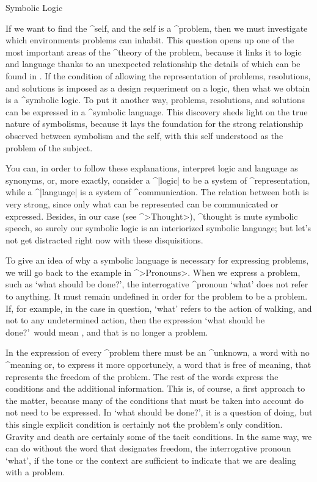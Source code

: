 \Section Symbolic Logic

If we want to find the ^{self}, and the self is a ^{problem}, then we
must investigate which environments problems can inhabit. This question
opens up one of the most important areas of the ^{theory of the
problem}, because it links it to logic and language thanks to an
unexpected relationship the details of which can be found in . If
the condition of allowing the representation of problems, resolutions,
and solutions is imposed as a design requeriment on a logic, then what
we obtain is a ^{symbolic logic}. To put it another way, problems,
resolutions, and solutions can be expressed in a ^{symbolic language}.
This discovery sheds light on the true nature of symbolisms, because it
lays the foundation for the strong relationship observed between
symbolism and the self, with this self understood as the problem of the
subject.

You can, in order to follow these explanations, interpret logic and
language as synonyms, or, more exactly, consider a ^|logic| to be a
system of ^{representation}, while a ^|language| is a system of
^{communication}. The relation between both is very strong, since only
what can be represented can be communicated or expressed. Besides, in
our case (see ^>Thought>), ^{thought} is mute symbolic speech, so surely
our symbolic logic is an interiorized symbolic language; but let's not
get distracted right now with these disquisitions.

To give an idea of why a symbolic language is necessary for expressing
problems, we will go back to the example in ^>Pronouns>. When we express
a problem, such as `what should be done?', the interrogative ^{pronoun}
`what' does not refer to anything. It must remain undefined in order for
the problem to be a problem. If, for example, in the case in question,
`what' refers to the action of walking, and not to any undetermined
action, then the expression `what should be done?'\ would mean
, and that is no longer a problem.

In the expression of every ^{problem} there must be an ^{unknown}, a
word with no ^{meaning} or, to express it more opportunely, a word that
is free of meaning, that represents the freedom of the problem. The rest
of the words express the conditions and the additional information. This
is, of course, a first approach to the matter, because many of the
conditions that must be taken into account do not need to be expressed.
In `what should be done?', it is a question of doing, but this single
explicit condition is certainly not the problem's only condition.
Gravity and death are certainly some of the tacit conditions. In the
same way, we can do without the word that designates freedom, the
interrogative pronoun `what', if the tone or the context are sufficient
to indicate that we are dealing with a problem.

